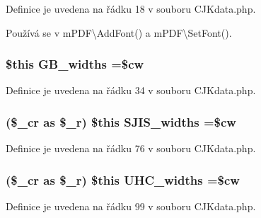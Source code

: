 Definice je uvedena na řádku 18 v souboru C\-J\-Kdata.\-php.



Používá se v m\-P\-D\-F\textbackslash{}\-Add\-Font() a m\-P\-D\-F\textbackslash{}\-Set\-Font().

\hypertarget{_c_j_kdata_8php_abcf44baace0069f775707f1d95f592ff}{
\subsubsection[{G\-B\-\_\-widths}]{\setlength{\rightskip}{0pt plus 5cm}\$this G\-B\-\_\-widths =\$cw}}\label{_c_j_kdata_8php_abcf44baace0069f775707f1d95f592ff}


Definice je uvedena na řádku 34 v souboru C\-J\-Kdata.\-php.

\hypertarget{_c_j_kdata_8php_a1ef0218d518e6c7672576ad34542caa6}{
\subsubsection[{S\-J\-I\-S\-\_\-widths}]{ (\$\-\_\-cr as \$\-\_\-r) \$this S\-J\-I\-S\-\_\-widths =\$cw}}\label{_c_j_kdata_8php_a1ef0218d518e6c7672576ad34542caa6}


Definice je uvedena na řádku 76 v souboru C\-J\-Kdata.\-php.

\hypertarget{_c_j_kdata_8php_a78c7553fbdb5c73294b1b4f24193b9bd}{
\subsubsection[{U\-H\-C\-\_\-widths}]{ (\$\-\_\-cr as \$\-\_\-r) \$this U\-H\-C\-\_\-widths =\$cw}}\label{_c_j_kdata_8php_a78c7553fbdb5c73294b1b4f24193b9bd}


Definice je uvedena na řádku 99 v souboru C\-J\-Kdata.\-php.


